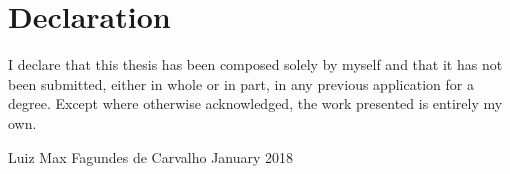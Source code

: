 \chapter{Declaration}
\vspace*{2\baselineskip}
I declare that this thesis has been composed 
solely by myself and that it has not been submitted, either in whole or
in part, in any previous application for a degree.
Except where otherwise acknowledged, the work presented is entirely my
own.
\vspace{6\baselineskip}\\
\begin{flushright}
\hspace*{\fill}
Luiz Max Fagundes de Carvalho
\newline
January 2018
\end{flushright}


\cleardoublepage
